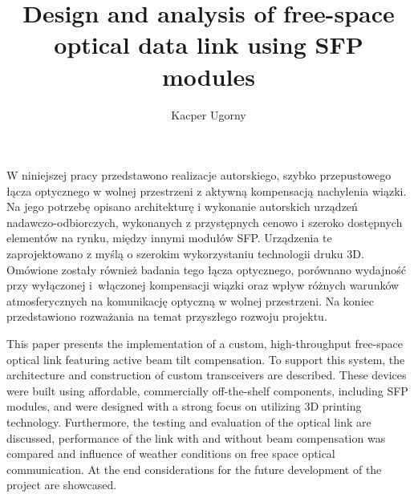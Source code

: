 \documentclass[master,oneside,en,oldtitlepage]{dyplompwr}
\title{Design and analysis of free-space optical data link using SFP modules}
\author{Kacper Ugorny}
\begin{document}
\maketitle
\setcounter{page}{2}

\newpage
\null

\newpage
\thispagestyle{plain}

\noindent\begin{minipage}[t][0.48\textheight][t]{\textwidth}

\vspace{8pt}
{\fontsize{16pt}{18pt}\selectfont
\setlength{\parindent}{1.5em}
\indent W niniejszej pracy przedstawono realizacje autorskiego, szybko przepustowego łącza optycznego w wolnej przestrzeni z aktywną kompensacją nachylenia wiązki. Na jego potrzebę opisano architekturę i wykonanie autorskich urządzeń nadawczo-odbiorczych, wykonanych z przystępnych cenowo i szeroko dostępnych elementów na rynku, między innymi modułów SFP.
Urządzenia te zaprojektowano z myślą o szerokim wykorzystaniu technologii druku 3D. 
Omówione zostały również badania tego łącza optycznego, porównano wydajność przy wyłączonej i~włączonej kompensacji wiązki oraz wpływ różnych warunków atmosferycznych na komunikację optyczną w wolnej przestrzeni. 
Na koniec przedstawiono rozważania na temat przyszłego rozwoju projektu. 
}
\end{minipage}

\vspace*{0.04\textheight}

\noindent\begin{minipage}[t][0.48\textheight][t]{\textwidth}

\vspace{8pt}
{\fontsize{16pt}{18pt}\selectfont
\setlength{\parindent}{1.5em}
\indent This paper presents the implementation of a custom, high-throughput free-space optical link featuring active beam tilt compensation. To support this system, the architecture and construction of custom transceivers are described. These devices were built using affordable, commercially off-the-shelf components, including SFP modules, and were designed with a strong focus on utilizing 3D printing technology. 
Furthermore, the testing and evaluation of the optical link are discussed, performance of the link with and without beam compensation was compared and influence of weather conditions on free space optical communication. 
At the end considerations for the future development of the project are showcased.
}
\end{minipage}
\end{document}
